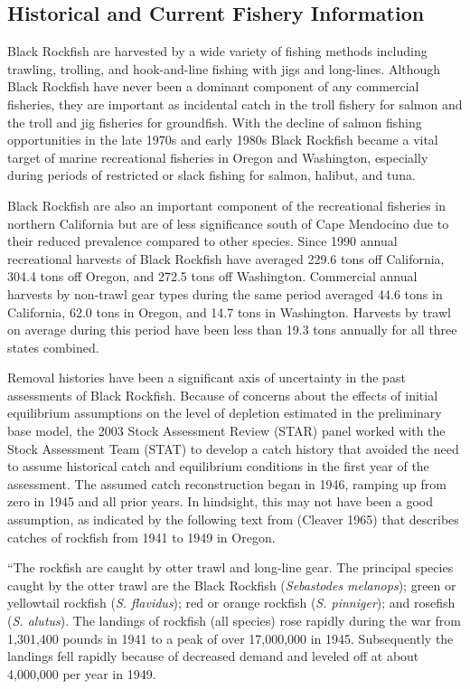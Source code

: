 \documentclass[11pt,
  english,
  letterpaper,
]{article}
\begin{document}
\hypertarget{historical-and-current-fishery-information}{%
\subsection{Historical and Current Fishery Information}\label{historical-and-current-fishery-information}}

Black Rockfish are harvested by a wide variety of fishing methods including trawling, trolling, and hook-and-line fishing with jigs and long-lines. Although Black Rockfish have never been a dominant component of any commercial fisheries, they are important as incidental catch in the troll fishery for salmon and the troll and jig fisheries for groundfish. With the decline of salmon fishing opportunities in the late 1970s and early 1980s Black Rockfish became a vital target of marine recreational fisheries in Oregon and Washington, especially during periods of restricted or slack fishing for salmon, halibut, and tuna.

Black Rockfish are also an important component of the recreational fisheries in northern California but are of less significance south of Cape Mendocino due to their reduced prevalence compared to other species. Since 1990 annual recreational harvests of Black Rockfish have averaged 229.6 tons off California, 304.4 tons off Oregon, and 272.5 tons off Washington. Commercial annual harvests by non-trawl gear types during the same period averaged 44.6 tons in California, 62.0 tons in Oregon, and 14.7 tons in Washington. Harvests by trawl on average during this period have been less than 19.3 tons annually for all three states combined.

Removal histories have been a significant axis of uncertainty in the past assessments of Black Rockfish. Because of concerns about the effects of initial equilibrium assumptions on the level of depletion estimated in the preliminary base model, the 2003 Stock Assessment Review (STAR) panel worked with the Stock Assessment Team (STAT) to develop a catch history that avoided the need to assume historical catch and equilibrium conditions in the first year of the assessment. The assumed catch reconstruction began in 1946, ramping up from zero in 1945 and all prior years. In hindsight, this may not have been a good assumption, as indicated by the following text from (Cleaver 1965) that describes catches of rockfish from 1941 to 1949 in Oregon.

``The rockfish are caught by otter trawl and long-line gear. The principal species caught by the otter trawl are the Black Rockfish (\emph{Sebastodes melanops}); green or yellowtail rockfish (\emph{S. flavidus}); red or orange rockfish (\emph{S. pinniger}); and rosefish (\emph{S. alutus}). The landings of rockfish (all species) rose rapidly during the war from 1,301,400 pounds in 1941 to a peak of over 17,000,000 in 1945. Subsequently the landings fell rapidly because of decreased demand and leveled off at about 4,000,000 per year in 1949.
\end{document}
